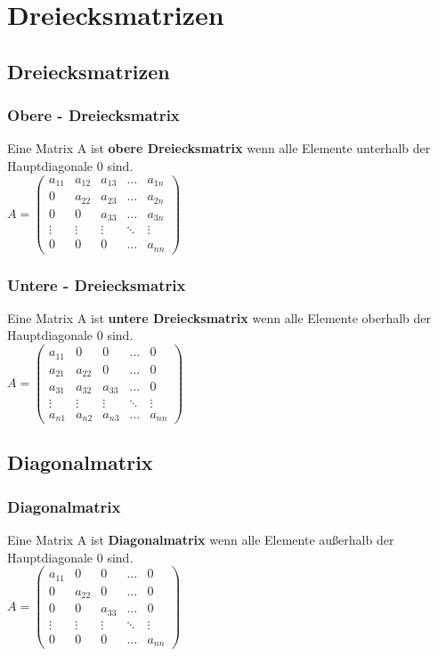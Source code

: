 \section{Dreiecksmatrizen}
\subsection{Dreiecksmatrizen}
\begin{frame}
\frametitle{Obere - Dreiecksmatrix}
Eine Matrix A ist \textbf{obere Dreiecksmatrix} wenn alle Elemente unterhalb der Hauptdiagonale 0 sind.\\
$A = \begin{pmatrix}
a_{11} & a_{12} & a_{13} & \dots & a_{1n}\\
0 & a_{22} & a_{23} & \dots & a_{2n}\\
0 & 0 & a_{33} & \dots & a_{3n}\\
\vdots & \vdots & \vdots & \ddots & \vdots\\
0 & 0 & 0 & \dots & a_{nn}
\end{pmatrix}$
\end{frame}

\begin{frame}
\frametitle{Untere - Dreiecksmatrix}
Eine Matrix A ist \textbf{untere Dreiecksmatrix} wenn alle Elemente oberhalb der Hauptdiagonale 0 sind.\\
$A = \begin{pmatrix}
a_{11} & 0 & 0 & \dots & 0\\
a_{21} & a_{22} & 0 & \dots & 0\\
a_{31} & a_{32} & a_{33} & \dots & 0\\
\vdots & \vdots & \vdots & \ddots & \vdots\\
a_{n1} & a_{n2} & a_{n3} & \dots & a_{nn}
\end{pmatrix}$
\end{frame}

\subsection{Diagonalmatrix}
\begin{frame}
\frametitle{Diagonalmatrix}
Eine Matrix A ist \textbf{Diagonalmatrix} wenn alle Elemente außerhalb der Hauptdiagonale 0 sind.\\
$A = \begin{pmatrix}
a_{11} & 0 & 0 & \dots & 0\\
0 & a_{22} & 0 & \dots & 0\\
0 & 0 & a_{33} & \dots & 0\\
\vdots & \vdots & \vdots & \ddots & \vdots\\
0 & 0 & 0 & \dots & a_{nn}
\end{pmatrix}$
\end{frame}


